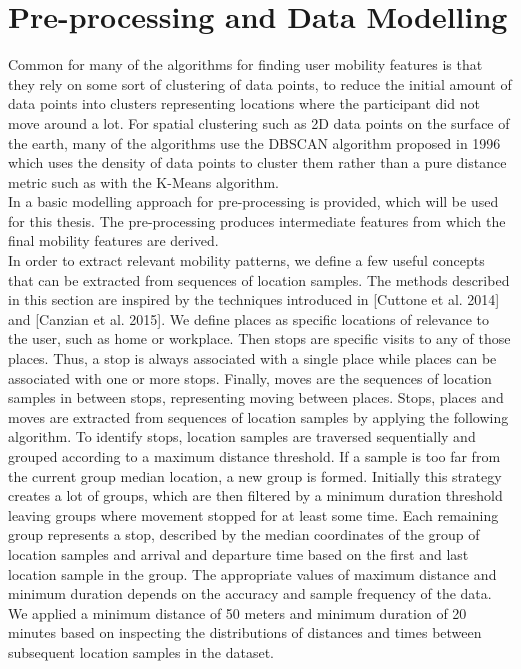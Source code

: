 \section{Pre-processing and Data Modelling}
Common for many of the algorithms for finding user mobility features is that they rely on some sort of clustering of data points, to reduce the initial amount of data points into clusters representing locations where the participant did not move around a lot. For spatial clustering such as 2D data points on the surface of the earth, many of the algorithms use the DBSCAN algorithm proposed in 1996  \cite{density-based-1996} which uses the density of data points to cluster them rather than a pure distance metric such as with the K-Means algorithm. \\

In \cite{sparse-location-2014} a basic modelling approach for pre-processing is provided, which will be used for this thesis. The pre-processing produces intermediate features from which the final mobility features are derived. \\

In order to extract relevant mobility patterns, we define a few useful concepts that can be extracted from sequences of location samples. The methods described in this section are inspired by the techniques introduced in [Cuttone et al. 2014] and [Canzian et al. 2015]. We define places as specific locations of relevance to the user, such as home or workplace. Then stops are specific visits to any of those places. Thus, a stop is always associated with a single place while places can be associated with one or more stops. Finally, moves are the sequences of location samples in between stops, representing moving between places. Stops, places and moves are extracted from sequences of location samples by applying the following algorithm. To identify stops, location samples are traversed sequentially and grouped according to a maximum distance threshold. If a sample is too far from the current group median location, a new group is formed. Initially this strategy creates a lot of groups, which are then filtered by a minimum duration threshold leaving groups where movement stopped for at least some time. Each remaining group represents a stop, described by the median coordinates of the group of location samples and arrival and departure time based on the first and last location sample in the group. The appropriate values of maximum distance and minimum duration depends on the accuracy and sample frequency of the data. We applied a minimum distance of 50 meters and minimum duration of 20 minutes based on inspecting the distributions of distances and times between subsequent location samples in the dataset.

